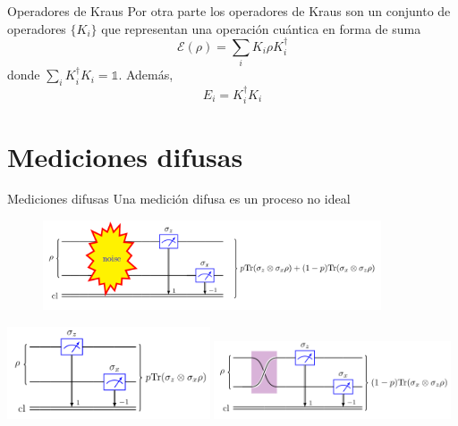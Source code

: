 \documentclass[svgnames,12pt,aspectratio=149]{beamer}
\newcommand{\E}{\mathcal{E}}
\begin{document}
\begin{frame}{Operadores de Kraus}
  Por otra parte los operadores de Kraus son un conjunto de operadores $\{K_i\} $ que representan una operación cuántica en forma de suma \begin{equation*}
    \E(\rho)=\sum_i K_i\rho K_i^\dagger \end{equation*}
  donde $\sum_{i}K_i^\dagger K_i=\mathds{1}$. Además, \[E_i=K_i^\dagger K_i\]
\end{frame}







\section{Mediciones difusas}

\begin{frame}{Mediciones difusas}
Una medición difusa es un proceso no ideal 

\begin{figure}[H]
  \centering
  \hspace*{-1cm}
 \includegraphics[width=100mm]{images/fm1.png}
  \caption*{}
\end{figure}

\vspace*{-0.7cm}
\includegraphics[width=60mm]{images/fmideal.png}
\hfill \includegraphics[width=70mm]{images/fm-nonideal.png}
\end{frame}
\end{document}
